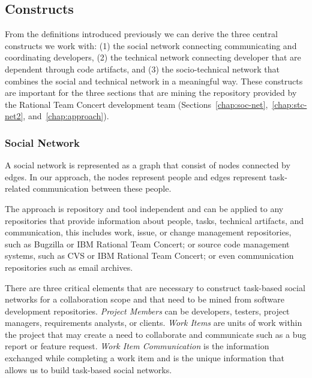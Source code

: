 \subsection{Constructs}
\label{c5:sec:constructs}
From the definitions introduced previously we can derive the three central constructs we work with: (1) the social network connecting communicating and coordinating developers, (2) the technical network connecting developer that are dependent through code artifacts, and (3) the socio-technical network that combines the social and technical network in a meaningful way.
These constructs are important for the three sections that are mining the repository provided by the Rational Team Concert development team (Sections~\ref{chap:soc-net},~\ref{chap:stc-net2}, and~\ref{chap:approach}).

\subsubsection{Social Network}
A social network is represented as a graph that consist of nodes connected by edges. 
In our approach, the nodes represent people and edges represent task-related communication between these people.

The approach is repository and tool independent and can be applied to any repositories that provide information about people, tasks, technical artifacts, and communication, this includes work, issue, or change management repositories, such as Bugzilla or IBM Rational Team Concert; or source code management systems, such as CVS or IBM Rational Team Concert; or even communication repositories such as email archives.

There are three critical elements that are necessary to construct task-based social networks for a collaboration scope and that need to be mined from software development repositories.
\emph{Project Members}  can be developers, testers, project managers, requirements analysts,
or clients. 
\emph{Work Items} are units of work within the project that may create a need to collaborate and communicate such as a bug report or feature request.
\emph{Work Item Communication} is the information exchanged while completing a work item and is the unique information that allows us to build task-based social networks.


